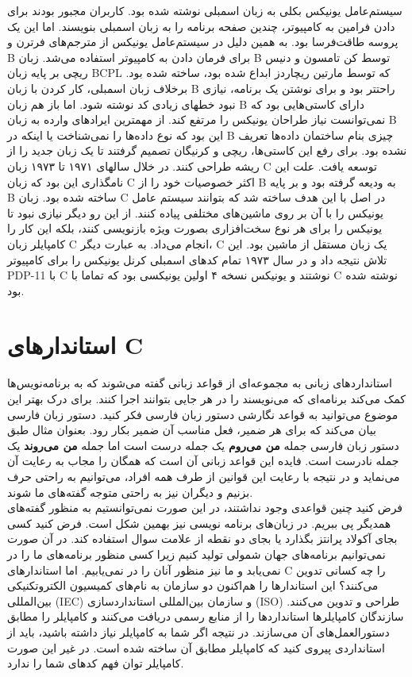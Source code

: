 سیستم‌عامل یونیکس بکلی به زبان اسمبلی نوشته شده بود. کاربران مجبور بودند برای دادن فرامین به کامپیوتر، چندین صفحه برنامه را به زبان اسمبلی بنویسند. اما این یک پروسه طاقت‌فرسا بود. به همین دلیل در سیستم‌عامل یونیکس از مترجم‌های فرترن و B برای فرمان دادن به کامپیوتر استفاده می‌شد. زبان B توسط کن تامسون و دنیس ریچی بر پایه زبان BCPL که توسط مارتین ریچاردز ابداع شده بود، ساخته شده بود. برخلاف زبان اسمبلی، کار کردن با زبان B راحتتر بود و برای نوشتن یک برنامه، نیازی نبود خطهای زیادی کد نوشته شود. اما باز هم زبان B دارای کاستی‌هایی بود که نمی‌توانست نیاز طراحان یونیکس را مرتفع کند. از مهمترین ایرادهای وارده به زبان B این بود که نوع داده‌ها را نمی‌شناخت یا اینکه در B چیزی بنام ساختمان داده‌ها تعریف نشده بود. برای رفع این کاستی‌ها، ریچی و کرنیگان تصمیم گرفتند تا یک زبان جدید را از ریشه طراحی کنند. در خلال سالهای ۱۹۷۱ تا ۱۹۷۳ زبان C توسعه یافت. علت این نامگذاری این بود که زبان C اکثر خصوصیات خود را از B به ودیعه گرفته بود و بر پایه B ساخته شده بود. زبان C در اصل با این هدف ساخته شد که بتوانند سیستم عامل یونیکس را با آن بر روی ماشین‌های مختلفی پیاده کنند. از این رو دیگر نیازی نبود تا یونیکس را برای هر نوع سخت‌افزاری بصورت ویژه بازنویسی کنند، بلکه این کار را کامپایلر زبان C انجام می‌داد. به عبارت دیگر، C یک زبان مستقل از ماشین بود. این تلاش نتیجه داد و در سال ۱۹۷۳ تمام کدهای اسمبلی کرنل یونیکس را برای کامپیوتر PDP-11 با C نوشتند و یونیکس نسخه ۴ اولین یونیکسی بود که تماما با C نوشته شده بود.
\section{استاندارهای C}
استانداردهای زبانی به مجموعه‌ای از قواعد زبانی گفته می‌شوند که به برنامه‌نویس‌ها کمک می‌کند برنامه‌ای که می‌نویسند را در هر جایی بتوانند اجرا کنند. برای درک بهتر این موضوع می‌توانید به قواعد نگارشی دستور زبان فارسی فکر کنید. دستور زبان فارسی بیان می‌کند که برای هر ضمیر، فعل مناسب آن ضمیر بکار رود. بعنوان مثال طبق دستور زبان فارسی جمله \textbf{من می‌روم} یک جمله درست است اما جمله \textbf{من می‌روند} یک جمله نادرست است. فایده این قواعد زبانی آن است که همگان را مجاب به رعایت آن می‌نماید و در نتیجه با رعایت این قوانین از طرف همه افراد، می‌توانیم به راحتی حرف بزنیم و دیگران نیز به راحتی متوجه گفته‌های ما شوند.\\
فرض کنید چنین قواعدی وجود نداشتند، در این صورت نمی‌توانستیم به منظور گفته‌های همدیگر پی ببریم. در زبان‌های برنامه نویسی نیز بهمین شکل است. فرض کنید کسی بجای آکولاد پرانتز بگذارد یا بجای دو نقطه از علامت سوال استفاده کند. در آن صورت نمی‌توانیم برنامه‌های جهان شمولی تولید کنیم زیرا کسی منظور برنامه‌های ما را در نمی‌یابد و ما نیز منظور آنان را در نمی‌یابیم. اما استاندارهای C را چه کسانی تدوین می‌کنند؟ این استاندارها را هم‌اکنون دو سازمان به نام‌های کمیسیون الکتروتکنیکی بین‌المللی (IEC) و سازمان بین‌المللی استانداردسازی (ISO) طراحی و تدوین می‌کنند. سازندگان کامپایلرها استانداردها را از منابع رسمی دریافت می‌کنند و کامپایلر را مطابق دستورالعمل‌های آن می‌سازند. در نتیجه اگر شما به کامپایلر نیاز داشته باشید، باید از استانداردی پیروی کنید که کامپایلر مطابق آن ساخته شده است. در غیر این صورت کامپایلر توان فهم کدهای شما را ندارد.
